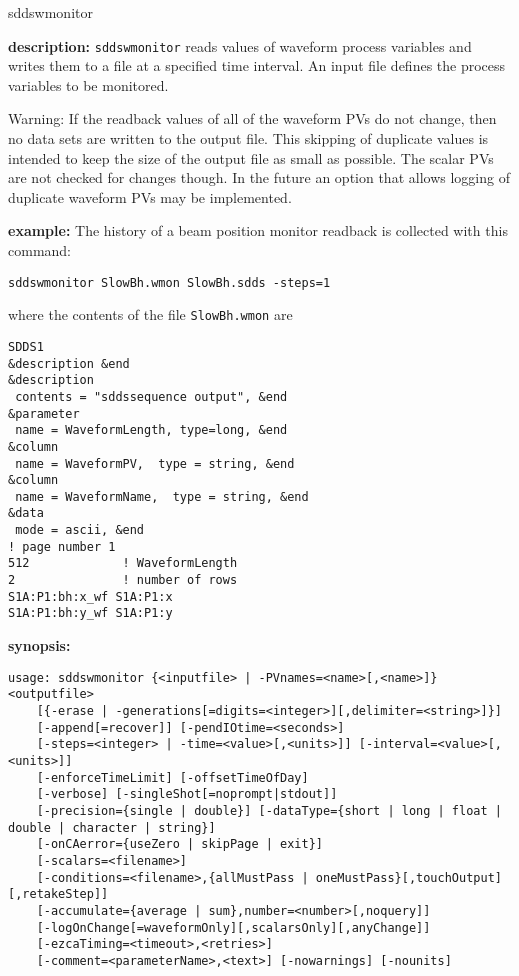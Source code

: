 \begin{sddsprog}{sddswmonitor}
\item \textbf{description:}
\verb+sddswmonitor+ reads values of waveform process variables 
and writes them to a file at a specified time interval.
An input file defines the process variables to be monitored.

Warning: If the readback values of all of the waveform PVs do not
change, then no data sets are written to the output file. This
skipping of duplicate values is intended to keep the size of the
output file as small as possible.  The scalar PVs are not checked for
changes though. In the future an option that allows logging of duplicate
waveform PVs may be implemented.

\item \textbf{example:} 
% 
The history of a beam position monitor readback is collected with this command:
\begin{verbatim}
sddswmonitor SlowBh.wmon SlowBh.sdds -steps=1
\end{verbatim}
where the contents of the file \verb+SlowBh.wmon+ are
\begin{verbatim}
SDDS1
&description &end
&description
 contents = "sddssequence output", &end
&parameter
 name = WaveformLength, type=long, &end
&column
 name = WaveformPV,  type = string, &end
&column
 name = WaveformName,  type = string, &end
&data
 mode = ascii, &end
! page number 1
512             ! WaveformLength
2               ! number of rows
S1A:P1:bh:x_wf S1A:P1:x
S1A:P1:bh:y_wf S1A:P1:y
\end{verbatim}
\item \textbf{synopsis:} 
\begin{verbatim}
usage: sddswmonitor {<inputfile> | -PVnames=<name>[,<name>]} <outputfile>
    [{-erase | -generations[=digits=<integer>][,delimiter=<string>]}]
    [-append[=recover]] [-pendIOtime=<seconds>]
    [-steps=<integer> | -time=<value>[,<units>]] [-interval=<value>[,<units>]]
    [-enforceTimeLimit] [-offsetTimeOfDay]
    [-verbose] [-singleShot[=noprompt|stdout]]
    [-precision={single | double}] [-dataType={short | long | float | double | character | string}]
    [-onCAerror={useZero | skipPage | exit}]
    [-scalars=<filename>]
    [-conditions=<filename>,{allMustPass | oneMustPass}[,touchOutput][,retakeStep]]
    [-accumulate={average | sum},number=<number>[,noquery]]
    [-logOnChange[=waveformOnly][,scalarsOnly][,anyChange]]
    [-ezcaTiming=<timeout>,<retries>]
    [-comment=<parameterName>,<text>] [-nowarnings] [-nounits]

\end{verbatim}
\end{sddsprog}
